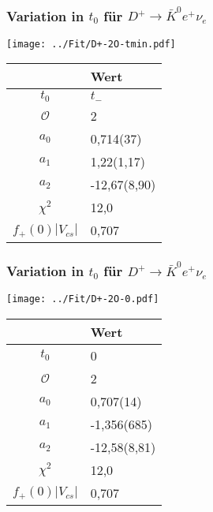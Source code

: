 \documentclass[hyperref={pdfpagelabels=false}]{beamer}
\begin{document}
\begin{frame}
 \frametitle{Variation in $t_0$ für $D^+\rightarrow \bar K^0 e^+ \nu_e$}
 \begin{minipage}[h]{0.66\textwidth}
  \texttt{[image: ../Fit/D+-2O-tmin.pdf]}
 \end{minipage}
 \begin{minipage}[h]{0.32\textwidth}
  \begin{table}[h]
   \begin{tabular}{c|l}
   \toprule
     & Wert\\
    \midrule
    $t_0$ & $t_-$\\
    $\mathcal{O}$ & 2\\
    \midrule
    $a_0$ & 0,714(37)\\
    $a_1$ & 1,22(1,17)\\
    $a_2$ & -12,67(8,90)\\
    \midrule
    $\chi^2$ & 12,0\\
    $f_+(0)|V_{cs}|$ & 0,707\\
    \bottomrule\bottomrule
   \end{tabular}

  \end{table}

 \end{minipage}
\end{frame}


\begin{frame}
 \frametitle{Variation in $t_0$ für $D^+\rightarrow \bar K^0 e^+ \nu_e$}
 \begin{minipage}[h]{0.66\textwidth}
  \texttt{[image: ../Fit/D+-2O-0.pdf]}
 \end{minipage}
 \begin{minipage}[h]{0.32\textwidth}
  \begin{table}[h]
   \begin{tabular}{c|l}
   \toprule
     & Wert\\
    \midrule
    $t_0$ & 0\\
    $\mathcal{O}$ & 2\\
    \midrule
    $a_0$ & 0,707(14)\\
    $a_1$ & -1,356(685)\\
    $a_2$ & -12,58(8,81)\\
    \midrule
    $\chi^2$ & 12,0\\
    $f_+(0)|V_{cs}|$ & 0,707\\
    \bottomrule\bottomrule
   \end{tabular}

  \end{table}

 \end{minipage}
\end{frame}
\end{document}
